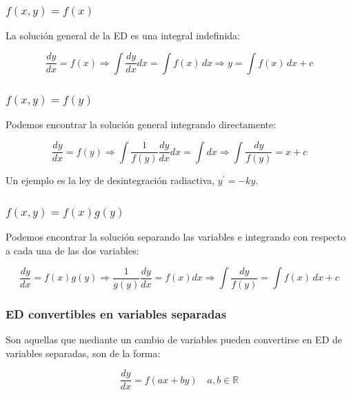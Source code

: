 \documentclass[a4paper,12pt,titlepage]{article}
\begin{document}
\subsubsection{$f(x,y)=f(x)$}

La solución general de la ED es una integral indefinida:

\begin{equation*}
    \frac{dy}{dx} = f(x) \Rightarrow \int \frac{dy}{dx} dx = \int f(x)\, dx \Rightarrow y = \int f(x) \, dx +c
\end{equation*}

\subsubsection{$f(x,y)=f(y)$}

Podemos encontrar la solución general integrando directamente:

\begin{equation*}
    \frac{dy}{dx} = f(y) \Rightarrow \int \frac{1}{f(y)}\frac{dy}{dx} dx = \int dx \Rightarrow \int \frac{dy}{f(y)} = x + c
\end{equation*}

Un ejemplo es la ley de desintegración radiactiva, $y^\prime=-ky$.

\subsubsection{$f(x,y)=f(x)g(y)$}

Podemos encontrar la solución separando las variables e integrando con respecto a cada una de las dos variables:

\begin{equation*}
    \frac{dy}{dx} = f(x)g(y) \Rightarrow \frac{1}{g(y)} \frac{dy}{dx} = f(x)dx \Rightarrow \int \frac{dy}{f(y)} = \int f(x)\,dx + c
\end{equation*}

\subsubsection{ED convertibles en variables separadas}

Son aquellas que mediante un cambio de variables pueden convertirse en ED de variables separadas, son de la forma:

\begin{equation*}
    \frac{dy}{dx} = f(ax + by) \quad a,b \in \mathbb{R}
\end{equation*}
\end{document}
